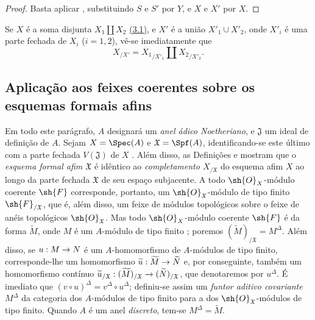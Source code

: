 \documentclass[oneside]{amsart}
\makeatletter
\newcommand{\ega@arrow}[2]{\mathchoice{#1}{#2}{#2}{#2}}
\renewcommand{\to}{\ega@arrow{\longrightarrow}{\rightarrow}}
\newcommand{\oldpage}[2][]{{\marginnote{\normalfont\textbf{#1}~|~#2}}\ignorespaces}
\let\EGAOriginalLabel\label
\renewcommand{\label}[1]{\phantomsection\EGAOriginalLabel{#1}}
\makeatother
\begin{document}
\begin{proof}
Basta aplicar , substituindo $S$ e $S'$ por $Y$, e $X$ e $X'$ por $X$.
\end{proof}

\begin{remark}[10.9.10]
\label{I.10.9.10}
\oldpage[I]{201}
Se $X$ é a soma disjunta $X_1\amalg X_2$ \hyperref[subsection:I.3.1]{(3.1)}, e $X'$ é a união $X'_1\cup X'_2$, onde $X'_i$ é uma parte fechada de $X_i$ ($i=1,2$), vê-se imediatamente que
\[
  X_{/X'}={X_1}_{/X'_1}\amalg {X_2}_{/X'_2}.
\]
\end{remark}

\subsection{Aplicação aos feixes coerentes sobre os esquemas formais afins}
\label{subsection:I.10.10}

\begin{env}[10.10.1]
\label{I.10.10.1}
Em todo este parágrafo, $A$ designará um \emph{anel ádico Noetheriano}, e $\mathfrak{J}$ um ideal de definição de $A$.
Sejam $X=\Spec(A)$ e $\mathfrak{X}=\Spf(A)$, identificando-se este último com a parte fechada $V(\mathfrak{J})$ de $X$ .
Além disso, as Definições  e  mostram que o \emph{esquema formal afim $\mathfrak{X}$} é idêntico ao \emph{completamento $X_{/\mathfrak{X}}$} do esquema afim $X$ ao longo da parte fechada $\mathfrak{X}$ de seu espaço subjacente.
A todo $\sh{O}_X$-módulo coerente $\sh{F}$ corresponde, portanto, um $\sh{O}_\mathfrak{X}$-módulo de tipo finito $\sh{F}_{/\mathfrak{X}}$, que é, além disso, um feixe de módulos topológicos sobre o feixe de anéis topológicos $\sh{O}_\mathfrak{X}$.
Mas todo $\sh{O}_X$-módulo coerente $\sh{F}$ é da forma $\widetilde{M}$, onde $M$ é um $A$-módulo de tipo finito ; poremos $(\widetilde{M})_{/\mathfrak{X}}=M^\Delta$.
Além disso, se $u:M\to N$ é um $A$-homomorfismo de $A$-módulos de tipo finito, corresponde-lhe um homomorfismo $\widetilde{u}:\widetilde{M}\to\widetilde{N}$ e, por conseguinte, também um homomorfismo contínuo $\widetilde{u}_{/\mathfrak{X}}:(\widetilde{M})_{/\mathfrak{X}}\to(\widetilde{N})_{/\mathfrak{X}}$, que denotaremos por $u^\Delta$.
É imediato que $(v\circ u)^\Delta=v^\Delta\circ u^\Delta$; definiu-se assim um \emph{funtor aditivo covariante $M^\Delta$} da categoria dos $A$-módulos de tipo finito para a dos $\sh{O}_\mathfrak{X}$-módulos de tipo finito.
Quando $A$ é um anel \emph{discreto}, tem-se $M^\Delta=\widetilde{M}$.
\end{env}
\end{document}

